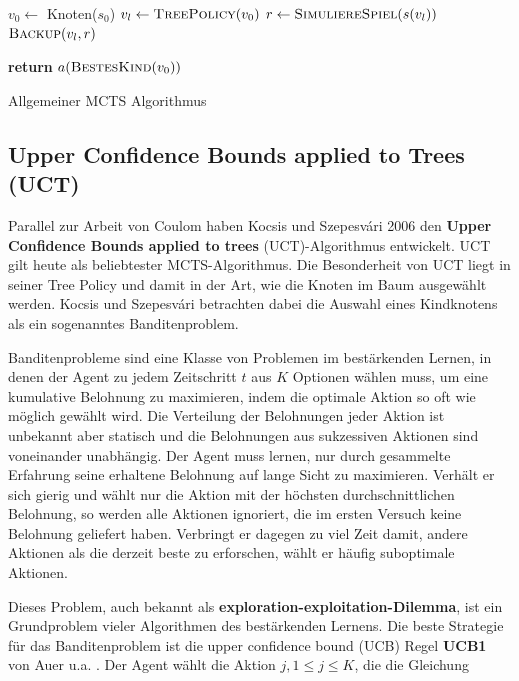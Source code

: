 \begin{algorithm}[H]
\begin{algorithmic}
	\State $v_0\gets$ Knoten($s_0$)
		\State $v_l\gets \Call{TreePolicy}{v_0}$
		\State $r\gets \Call{SimuliereSpiel}{s(v_l)}$
		\State $\Call{Backup}{v_l, r}$
	\EndWhile

\State \textbf{return} $a(\Call{BestesKind}{v_0})$
\EndFunction
\end{algorithmic}
\caption{Allgemeiner MCTS Algorithmus\footnotemark}
\label{algo:mcts}
\end{algorithm}

\subsection{Upper Confidence Bounds applied to Trees (UCT)}
\label{chap:UCT}
Parallel zur Arbeit von Coulom haben Kocsis und Szepesv\'{a}ri 2006 den \textbf{Upper Confidence Bounds applied to trees} (UCT)-Algorithmus \autocite{kocsisBanditBasedMonteCarlo2006} entwickelt. UCT gilt heute als beliebtester MCTS-Algorithmus. Die Besonderheit von UCT liegt in seiner Tree Policy und damit in der Art, wie die Knoten im Baum ausgewählt werden. Kocsis und Szepesv\'{a}ri betrachten dabei die Auswahl eines Kindknotens als ein sogenanntes Banditenproblem. \autocite[\ppno~25\psqq]{suttonReinforcementLearningIntroduction2018}

\bigskip
Banditenprobleme sind eine Klasse von Problemen im bestärkenden Lernen, in denen der Agent zu jedem Zeitschritt $t$ aus $K$ Optionen wählen muss, um eine kumulative Belohnung zu maximieren, indem die optimale Aktion so oft wie möglich gewählt wird. Die Verteilung der Belohnungen jeder Aktion ist unbekannt aber statisch und die Belohnungen aus sukzessiven Aktionen sind voneinander unabhängig. Der Agent muss lernen, nur durch gesammelte Erfahrung seine erhaltene Belohnung auf lange Sicht zu maximieren. Verhält er sich gierig und wählt nur die Aktion mit der höchsten durchschnittlichen Belohnung, so werden alle Aktionen ignoriert, die im ersten Versuch keine Belohnung geliefert haben. Verbringt er dagegen zu viel Zeit damit, andere Aktionen als die derzeit beste zu erforschen, wählt er häufig suboptimale Aktionen. 

Dieses Problem, auch bekannt als \textbf{exploration-exploitation-Dilemma}, ist ein Grundproblem vieler Algorithmen des bestärkenden Lernens. Die beste Strategie für das Banditenproblem ist die upper confidence bound (UCB) Regel \textbf{UCB1} von Auer u.a. \autocite[\ppno~237]{auerFinitetimeAnalysisMultiarmed2002}. Der Agent wählt die Aktion $j, 1 \le j \le K$, die die Gleichung

